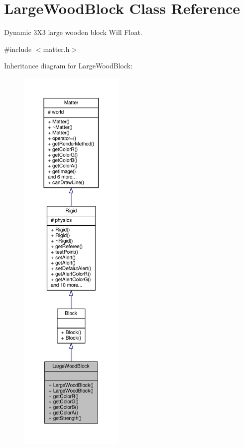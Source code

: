 \hypertarget{classLargeWoodBlock}{}\section{Large\+Wood\+Block Class Reference}
\label{classLargeWoodBlock}


Dynamic 3\+X3 large wooden block Will Float.  




{\ttfamily \#include $<$matter.\+h$>$}



Inheritance diagram for Large\+Wood\+Block\+:\nopagebreak
\begin{figure}[H]
\begin{center}
\leavevmode
\includegraphics[height=550pt]{classLargeWoodBlock__inherit__graph}
\end{center}
\end{figure}


